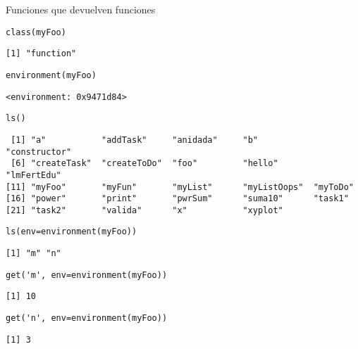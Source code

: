 \documentclass[xcolor={usenames,svgnames,dvipsnames}]{beamer}
\begin{document}
\begin{frame}[fragile,label=sec-2-6]{Funciones que devuelven funciones}
 \lstset{language=R,numbers=none}
\begin{lstlisting}
class(myFoo)
\end{lstlisting}

\begin{verbatim}
[1] "function"
\end{verbatim}

\lstset{language=R,numbers=none}
\begin{lstlisting}
environment(myFoo)
\end{lstlisting}

\begin{verbatim}
<environment: 0x9471d84>
\end{verbatim}

\lstset{language=R,numbers=none}
\begin{lstlisting}
ls()
\end{lstlisting}

\begin{verbatim}
 [1] "a"           "addTask"     "anidada"     "b"           "constructor"
 [6] "createTask"  "createToDo"  "foo"         "hello"       "lmFertEdu"  
[11] "myFoo"       "myFun"       "myList"      "myListOops"  "myToDo"     
[16] "power"       "print"       "pwrSum"      "suma10"      "task1"      
[21] "task2"       "valida"      "x"           "xyplot"
\end{verbatim}

\lstset{language=R,numbers=none}
\begin{lstlisting}
ls(env=environment(myFoo))
\end{lstlisting}

\begin{verbatim}
[1] "m" "n"
\end{verbatim}

\lstset{language=R,numbers=none}
\begin{lstlisting}
get('m', env=environment(myFoo))
\end{lstlisting}

\begin{verbatim}
[1] 10
\end{verbatim}

\lstset{language=R,numbers=none}
\begin{lstlisting}
get('n', env=environment(myFoo))
\end{lstlisting}

\begin{verbatim}
[1] 3
\end{verbatim}
\end{frame}
\end{document}

